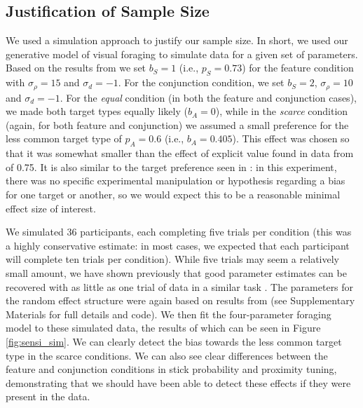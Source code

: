 \documentclass[12pt]{article}
\begin{document}
\subsection{Justification of Sample Size}
\label{sec:samplesize}

We used a simulation approach to justify our sample size. In short, we used our generative model of visual foraging to simulate data for a given set of parameters. Based on the results from \citep{clarke2022foraging} we set $b_S=1$ (i.e., $p_S=0.73$) for the feature condition with $\sigma_{\rho}=15$ and $\sigma_d=-1$. For the conjunction condition, we set $b_S=2$, $\sigma_{\rho}=10$ and  $\sigma_d=-1$. For the \textit{equal} condition (in both the feature and conjunction cases), we made both target types equally likely ($b_A=0$), while in the \textit{scarce} condition (again, for both feature and conjunction) we assumed a small preference for the less common target type of $p_A=0.6$ (i.e., $b_A=0.405$). This effect was chosen so that it was somewhat smaller than the effect of explicit value found in data from \citep{tagu2022selection} of 0.75. It is also similar to the target preference seen in \citep{clarke2022stable}: in this experiment, there was no specific experimental manipulation or hypothesis regarding a bias for one target or another, so we would expect this to be a reasonable minimal effect size of interest.

We simulated 36 participants, each completing five trials per condition (this was a highly conservative estimate: in most cases, we expected that each participant will complete ten trials per condition). While five trials may seem a relatively small amount, we have shown previously that good parameter estimates can be recovered with as little as one trial of data in a similar task \citep{clarke2022foraging}. The parameters for the random effect structure were again based on results from \citep{clarke2022foraging} (see Supplementary Materials for full details and code). We then fit the four-parameter foraging model to these simulated data, the results of which can be seen in Figure \ref{fig:sensi_sim}. We can clearly detect the bias towards the less common target type in the scarce conditions. We can also see clear differences between the feature and conjunction conditions in stick probability and proximity tuning, demonstrating that we should have been able to detect these effects if they were present in the data.
\end{document}
